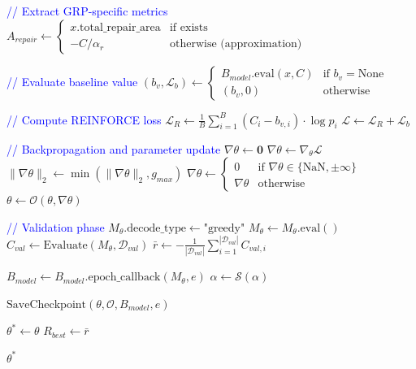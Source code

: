 \documentclass[AutoFakeBold]{LZUThesis}
\begin{document}
\begin{algorithm}[h]
\begin{algorithmic}[1]
		\State \textcolor{blue}{// Extract GRP-specific metrics}
		\State $A_{repair} \leftarrow \begin{cases}
				x.\text{total\_repair\_area} & \text{if exists}                 \\
				-C / \alpha_{r}              & \text{otherwise (approximation)}
			\end{cases}$
		\EndIf

		\State \textcolor{blue}{// Evaluate baseline value}
		\State $(b_v, \mathcal{L}_{b}) \leftarrow \begin{cases}
				B_{model}.\text{eval}(x, C) & \text{if } b_v = \text{None} \\
				(b_v, 0)                    & \text{otherwise}
			\end{cases}$

		\State \textcolor{blue}{// Compute REINFORCE loss}
		\State $\mathcal{L}_{R} \leftarrow \frac{1}{B}\sum_{i=1}^{B}(C_i - b_{v,i}) \cdot \log p_i$ 
		\State $\mathcal{L} \leftarrow \mathcal{L}_{R} + \mathcal{L}_{b}$ 

		\State \textcolor{blue}{// Backpropagation and parameter update}
		\State $\nabla\theta \leftarrow \mathbf{0}$ 
		\State $\nabla\theta \leftarrow \nabla_{\theta}\mathcal{L}$ 
		\State $\|\nabla\theta\|_2 \leftarrow \min(\|\nabla\theta\|_2, g_{max})$ 
		\State $\nabla\theta \leftarrow \begin{cases}
				0            & \text{if } \nabla\theta \in \{\text{NaN}, \pm\infty\} \\
				\nabla\theta & \text{otherwise}
			\end{cases}$ 
		\State $\theta \leftarrow \mathcal{O}(\theta, \nabla\theta)$ 
		\EndFor

		\State \textcolor{blue}{// Validation phase}
		\State $M_{\theta}.\text{decode\_type} \leftarrow \text{"greedy"}$
		\State $M_{\theta} \leftarrow M_{\theta}.\text{eval}()$
		\State $C_{val} \leftarrow \text{Evaluate}(M_{\theta}, \mathcal{D}_{val})$ 
		\State $\bar{r} \leftarrow -\frac{1}{|\mathcal{D}_{val}|}\sum_{i=1}^{|\mathcal{D}_{val}|} C_{val,i}$ 

		\State $B_{model} \leftarrow B_{model}.\text{epoch\_callback}(M_{\theta}, e)$ 
		\State $\alpha \leftarrow \mathcal{S}(\alpha)$ 

		\State $\text{SaveCheckpoint}(\theta, \mathcal{O}, B_{model}, e)$
		\EndIf

		\State $\theta^* \leftarrow \theta$
		\State $R_{best} \leftarrow \bar{r}$
		\EndIf
		\EndFor

		\State \Return $\theta^*$
	\end{algorithmic}
\end{algorithm}
\end{document}
